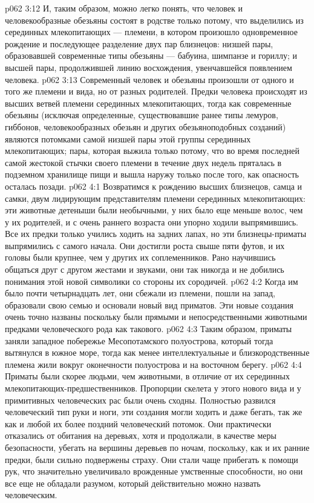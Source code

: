 \vs p062 3:12 И, таким образом, можно легко понять, что человек и человекообразные обезьяны состоят в родстве только потому, что выделились из серединных млекопитающих --- племени, в котором произошло одновременное рождение и последующее разделение двух пар близнецов: низшей пары, образовавшей современные типы обезьяны --- бабуина, шимпанзе и гориллу; и высшей пары, продолжившей линию восхождения, увенчавшейся появлением человека.
\vs p062 3:13 Современный человек и обезьяны произошли от одного и того же племени и вида, но от разных родителей. Предки человека происходят из высших ветвей племени серединных млекопитающих, тогда как современные обезьяны (исключая определенные, существовавшие ранее типы лемуров, гиббонов, человекообразных обезьян и других обезьяноподобных созданий) являются потомками самой низшей пары этой группы серединных млекопитающих; пары, которая выжила только потому, что во время последней самой жестокой стычки своего племени в течение двух недель пряталась в подземном хранилище пищи и вышла наружу только после того, как опасность осталась позади.
\vs p062 4:1 Возвратимся к рождению высших близнецов, самца и самки, двум лидирующим представителям племени серединных млекопитающих: эти животные детеныши были необычными, у них было еще меньше волос, чем у их родителей, и с очень раннего возраста они упорно ходили выпрямившись. Все их предки только учились ходить на задних лапах, но эти близнецы\hyp{}приматы выпрямились с самого начала. Они достигли роста свыше пяти футов, и их головы были крупнее, чем у других их соплеменников. Рано научившись общаться друг с другом жестами и звуками, они так никогда и не добились понимания этой новой символики со стороны их сородичей.
\vs p062 4:2 Когда им было почти четырнадцать лет, они сбежали из племени, пошли на запад, образовали свою семью и основали новый вид приматов. Эти новые создания очень точно названы  поскольку были прямыми и непосредственными животными предками человеческого рода как такового.
\vs p062 4:3 Таким образом, приматы заняли западное побережье Месопотамского полуострова, который тогда вытянулся в южное море, тогда как менее интеллектуальные и близкородственные племена жили вокруг оконечности полуострова и на восточном берегу.
\vs p062 4:4 \pc Приматы были скорее людьми, чем животными, в отличие от их серединных млекопитающих\hyp{}предшественников. Пропорции скелета у этого нового вида и у примитивных человеческих рас были очень сходны. Полностью развился человеческий тип руки и ноги, эти создания могли ходить и даже бегать, так же как и любой их более поздний человеческий потомок. Они практически отказались от обитания на деревьях, хотя и продолжали, в качестве меры безопасности, убегать на вершины деревьев по ночам, поскольку, как и их ранние предки, были сильно подвержены страху. Они стали чаще прибегать к помощи рук, что значительно увеличивало врожденные умственные способности, но они все еще не обладали разумом, который действительно можно назвать человеческим.
